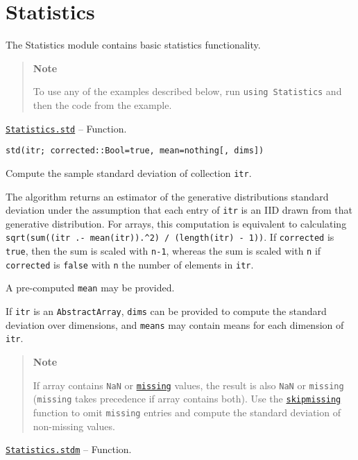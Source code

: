 \hypertarget{9437621938979276328}{}


\chapter{Statistics}



The Statistics module contains basic statistics functionality.



\begin{quote}
\textbf{Note}

To use any of the examples described below, run \texttt{using Statistics} and then the code from the example.

\end{quote}

\hypertarget{1955374586742019663}{} 
\hyperlink{1955374586742019663}{\texttt{Statistics.std}}  -- {Function.}

\begin{adjustwidth}{2em}{0pt}


\begin{verbatim}
std(itr; corrected::Bool=true, mean=nothing[, dims])
\end{verbatim}

Compute the sample standard deviation of collection \texttt{itr}.

The algorithm returns an estimator of the generative distribution{\textquotesingle}s standard deviation under the assumption that each entry of \texttt{itr} is an IID drawn from that generative distribution. For arrays, this computation is equivalent to calculating \texttt{sqrt(sum((itr .- mean(itr)).{\textasciicircum}2) / (length(itr) - 1))}. If \texttt{corrected} is \texttt{true}, then the sum is scaled with \texttt{n-1}, whereas the sum is scaled with \texttt{n} if \texttt{corrected} is \texttt{false} with \texttt{n} the number of elements in \texttt{itr}.

A pre-computed \texttt{mean} may be provided.

If \texttt{itr} is an \texttt{AbstractArray}, \texttt{dims} can be provided to compute the standard deviation over dimensions, and \texttt{means} may contain means for each dimension of \texttt{itr}.

\begin{quote}
\textbf{Note}

If array contains \texttt{NaN} or \hyperlink{14596725676261444434}{\texttt{missing}} values, the result is also \texttt{NaN} or \texttt{missing} (\texttt{missing} takes precedence if array contains both). Use the \hyperlink{2012470681884771400}{\texttt{skipmissing}} function to omit \texttt{missing} entries and compute the standard deviation of non-missing values.

\end{quote}


\end{adjustwidth}
\hypertarget{11197607150486088950}{} 
\hyperlink{11197607150486088950}{\texttt{Statistics.stdm}}  -- {Function.}

